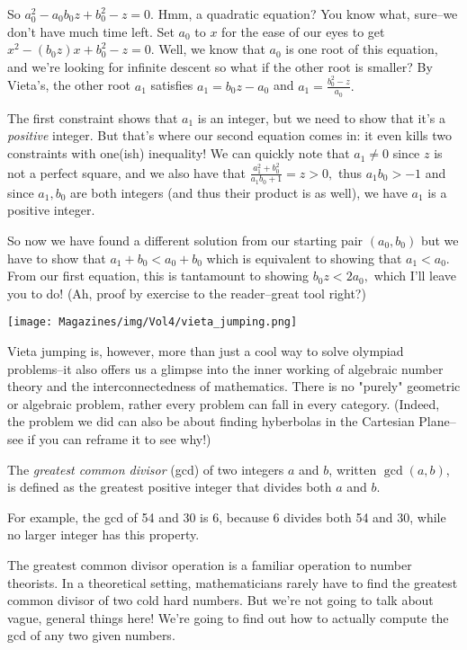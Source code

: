 \documentclass{article}
\begin{document}
\begin{multicols}{3}
So $a_0^2-a_0b_0z+b_0^2-z=0.$ Hmm, a quadratic equation? You know what, sure--we don't have much time left. Set $a_0$ to $x$ for the ease of our eyes to get $x^2-(b_0z)x+b_0^2-z=0.$ Well, we know that $a_0$ is one root of this equation, and we're looking for infinite descent so what if the other root is smaller? By Vieta's, the other root $a_1$ satisfies $a_1=b_0z-a_0$ and $a_1=\frac{b_0^2-z}{a_0}.$

The first constraint shows that $a_1$ is an integer, but we need to show that it's a \textit{positive} integer. But that's where our second equation comes in: it even kills two constraints with one(ish) inequality! We can quickly note that $a_1 \ne 0$ since $z$ is not a perfect square, and we also have that $\frac{a_1^2+b_0^2}{a_1b_0+1}=z > 0,$ thus $a_1b_0 > -1$ and since $a_1, b_0$ are both integers (and thus their product is as well), we have $a_1$ is a positive integer. 

So now we have found a different solution from our starting pair $(a_0,b_0)$ but we have to show that $a_1+b_0 < a_0+b_0$ which is equivalent to showing that $a_1<a_0.$ From our first equation, this is tantamount to showing $b_0z<2a_0,$ which I'll leave you to do! (Ah, proof by exercise to the reader--great tool right?)

\begin{center}
\texttt{[image: Magazines/img/Vol4/vieta\_jumping.png]}
\end{center}

Vieta jumping is, however, more than just a cool way to solve olympiad problems--it also offers us a glimpse into the inner working of algebraic number theory and the interconnectedness of mathematics. There is no "purely" geometric or algebraic problem, rather every problem can fall in every category. (Indeed, the problem we did can also be about finding hyberbolas in the Cartesian Plane--see if you can reframe it to see why!)
\closearticle


The \textit{greatest common divisor} (gcd) of two integers $a$ and $b$, written $\gcd(a, b)$, is defined as the greatest positive integer that divides both $a$ and $b$.

For example, the gcd of 54 and 30 is 6, because 6 divides both 54 and 30, while no larger integer has this property.

The greatest common divisor operation is a familiar operation to number theorists. In a theoretical setting, mathematicians rarely have to find the greatest common divisor of two cold hard numbers. But we're not going to talk about vague, general things here! We're going to find out how to actually compute the gcd of any two given numbers.


\end{multicols}
\end{document}
